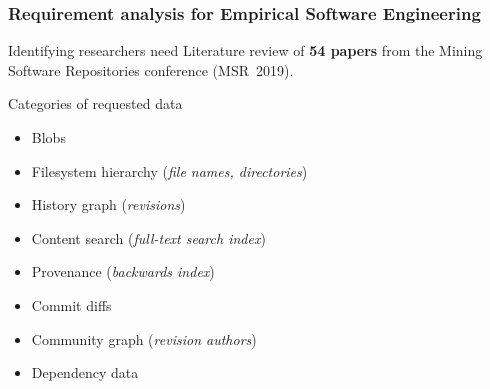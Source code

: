 \documentclass[aspectratio=169,xcolor=table]{beamer}
\begin{document}
    \begin{frame}
        \frametitle{Requirement analysis for Empirical Software Engineering}


        \begin{block}{Identifying researchers need}
            Literature review of \textbf{54 papers} from the Mining Software
            Repositories conference (MSR~2019).
        \end{block}

        \begin{block}{Categories of requested data}
            \begin{itemize}
                \item Blobs
                \item Filesystem hierarchy (\emph{file names, directories})
                \item History graph (\emph{revisions})
                \item Content search (\emph{full-text search index})
                \item Provenance (\emph{backwards index})
                \item Commit diffs
                \item Community graph (\emph{revision authors})
                \item Dependency data
            \end{itemize}
        \end{block}
    \end{frame}
\end{document}
